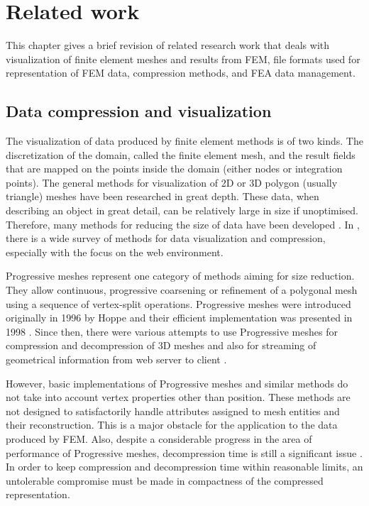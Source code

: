 \chapter{Related work}
\label{chapter:related-work}

This chapter gives a brief revision of related research work that deals with visualization of finite element meshes and results from FEM, file formats used for representation of FEM data, compression methods, and FEA data management.


\section{Data compression and visualization}

The visualization of data produced by finite element methods is of two kinds. The discretization of the domain, called the finite element mesh, and the result fields that are mapped on the points inside the domain (either nodes or integration points). The general methods for visualization of 2D or 3D polygon (usually triangle) meshes have been researched in great depth. These data, when describing an object in great detail, can be relatively large in size if unoptimised. Therefore, many methods for reducing the size of data have been developed \cite{Alliez2005}. In \cite{Evans2014}, there is a wide survey of methods for data visualization and compression, especially with the focus on the web environment.

Progressive meshes represent one category of methods aiming for size reduction. They allow continuous, progressive coarsening or refinement of a polygonal mesh using a sequence of vertex-split operations. Progressive meshes were introduced originally in 1996 by Hoppe \cite{Hoppe1996} and their efficient implementation was presented in 1998 \cite{Hoppe1998}. Since then, there were various attempts to use Progressive meshes for compression and decompression of 3D meshes \cite{Gudukbay2002, Valette2004, Valette2009, Lavoue2013} and also for streaming of geometrical information from web server to client \cite{Alliez2001, Maglo2012}.

However, basic implementations of Progressive meshes and similar methods do not take into account vertex properties other than position. These methods are not designed to satisfactorily handle attributes assigned to mesh entities and their reconstruction. This is a major obstacle for the application to the data produced by FEM. Also, despite a considerable progress in the area of performance of Progressive meshes, decompression time is still a significant issue \cite{Limper2013}. In order to keep compression and decompression time within reasonable limits, an untolerable compromise must be made in compactness of the compressed representation.


